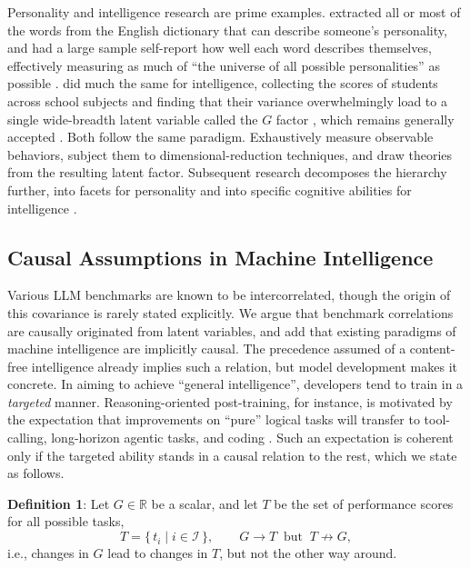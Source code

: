\documentclass{article} %
\begin{document}
Personality and intelligence research are prime examples. \citet{allport1936} extracted all or most of the words from the English dictionary that can describe someone's personality, and had a large
sample self-report how well each word describes themselves, effectively measuring as much of ``the universe of all possible personalities'' as possible \citep{john1988}. \citet{spearman1904} did much
the same for intelligence, collecting the scores of students across school subjects and finding that their variance overwhelmingly load to a single wide-breadth latent variable called the \(G\) factor
\citep{jensen2002}, which remains generally accepted \citep{johnson2004,johnson2008}. Both follow the same paradigm. Exhaustively measure observable behaviors, subject them to dimensional-reduction
techniques, and draw theories from the resulting latent factor. Subsequent research decomposes the hierarchy further, into facets for personality \citep{lee2018,deyoung2007} and into specific
cognitive abilities for intelligence \citep{schneider2018}.

\hypertarget{causal-assumptions-in-machine-intelligence}{%
\subsection{Causal Assumptions in Machine Intelligence}\label{causal-assumptions-in-machine-intelligence}}

Various LLM benchmarks are known to be intercorrelated, though the origin of this covariance is rarely stated explicitly. We argue that benchmark correlations are causally originated from latent
variables, and add that existing paradigms of machine intelligence are implicitly causal. The precedence assumed of a content-free intelligence \citep{chollet2019} already implies such a relation, but
model development makes it concrete. In aiming to achieve ``general intelligence'', developers tend to train in a \emph{targeted} manner. Reasoning-oriented post-training, for instance, is motivated
by the expectation that improvements on ``pure'' logical tasks will transfer to tool-calling, long-horizon agentic tasks, and coding \citep{deepseekai2025}. Such an expectation is coherent only if the
targeted ability stands in a causal relation to the rest, which we state as follows.

\textbf{Definition 1}: Let \(G \in \mathbb{R}\) be a scalar, and let \(T\) be the set of performance scores for all possible tasks,
\[T = \{\, t_i \mid i \in \mathcal{I} \,\}, \qquad G \longrightarrow T \;\;\text{but}\;\; T \not\longrightarrow G,\] i.e., changes in \(G\) lead to changes in \(T\), but not the other way around.
\end{document}
